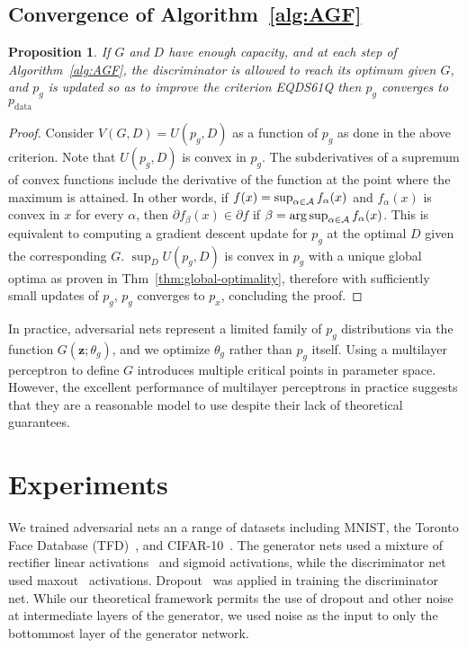 \documentclass{article}
\newtheorem{proposition}{Proposition}
\begin{document}
\subsection{Convergence of Algorithm~\ref{alg:AGF}}
\label{sec:convergence-of-algorithm}

\begin{proposition}
If $G$ and $D$ have enough capacity, and at each step of Algorithm~\ref{alg:AGF}, the discriminator is allowed to reach its optimum given $G$, and $p_g$ is updated so as to improve the criterion  EQDS61Q  then $p_g$ converges to $p_\text{data}$
\end{proposition}

\begin{proof}
Consider $V(G,D)=U(p_g,D)$ as a function of $p_g$ as done in the above criterion. Note that $U(p_g,D)$ is convex in $p_g$. The subderivatives of a supremum of convex functions include the derivative of the function at the point where the maximum is attained. In other words, if $f(x) = \sup_{\alpha \in \cal{A}} f_\alpha(x)$ and $f_\alpha(x)$ is convex in $x$ for every $\alpha$, then $\partial f_\beta(x) \in \partial f$ if $\beta = \arg \sup_{\alpha \in \cal{A}} f_\alpha(x)$. This is equivalent to computing a gradient descent update for $p_g$ at the optimal $D$ given the corresponding $G$. $\sup_D U(p_g,D)$ is convex in $p_g$ with a unique global optima as proven in Thm~\ref{thm:global-optimality}, therefore with sufficiently small updates of $p_g$, $p_g$ converges to $p_x$, concluding the proof.
\end{proof}

In practice, adversarial nets represent a limited family of $p_g$ distributions via the function $G(\bm{z}; \theta_g)$,
and we optimize $\theta_g$ rather than $p_g$ itself. Using a multilayer perceptron to define $G$ introduces multiple
critical points in parameter space.
However, the excellent performance of multilayer
perceptrons in practice suggests that they are a reasonable model to use despite their lack of theoretical guarantees.

\section{Experiments}

We trained adversarial nets an a range of datasets including MNIST\citep{LeCun+98}, the
Toronto Face Database (TFD)~\cite{Susskind2010}, and CIFAR-10~\citep{KrizhevskyHinton2009}.
The generator nets used a mixture of rectifier linear
activations~\cite{Jarrett-ICCV2009,Glorot+al-AI-2011-small} and sigmoid
activations, while the discriminator net used maxout~\cite{Goodfellow_maxout_2013} activations.
Dropout~\cite{Hinton-et-al-arxiv2012} was applied in training the
discriminator net. While our theoretical framework permits the use of dropout and other noise
at intermediate layers of the generator, we used noise as the input to only the bottommost layer
of the generator network.
\end{document}
